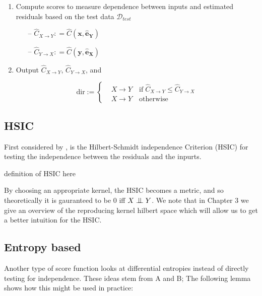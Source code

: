 \begin{algorithm}[H]
\begin{enumerate}
        \item Compute scores to measure dependence between inputs and estimated residuals based on the
        test data $\mathcal{D}_{test}$
        \begin{itemize}
            \item[--] $\hat{C}_{X \rightarrow Y}: = \hat{C}(\mathbf{x}, \mathbf{\hat{e}_Y})$ 
            \item[--] $\hat{C}_{Y \rightarrow X}: = \hat{C}(\mathbf{y}, \mathbf{\hat{e}_X})$
        \end{itemize}        

        \item Output $\hat{C}_{X \rightarrow Y}$, $\hat{C}_{Y \rightarrow X}$, and
        
        \[ 
        \text{dir} :=  
         \begin{cases} 
            & X \rightarrow Y \quad \text{if} \; \hat{C}_{X \rightarrow Y} \leq \hat{C}_{Y \rightarrow X}\\
            & X \rightarrow Y \quad \text{otherwise}
         \end{cases}
        \]
        
    \end{enumerate}

  \label{alg:anm_general}
  \end{algorithm}


\subsection{HSIC}

First considered by \cite{hoyer2009nonlinear}, is the Hilbert-Schmidt independence Criterion (HSIC) for
testing the independence between the residuals and the inpurts. 

definition of HSIC here

By choosing an appropriate kernel, the HSIC becomes a metric, and so theoretically it is gauranteed to 
be 0 iff $X \bigCI Y$. We note that in Chapter 3 we give an overview of the reproducing kernel hilbert 
space which will allow us to get a better intuition for the HSIC. 

\subsection{Entropy based}

Another type of score function looks at differential entropies instead of directly testing for independence.
These ideas stem from A and B; The following lemma shows how this might be used in practice:

